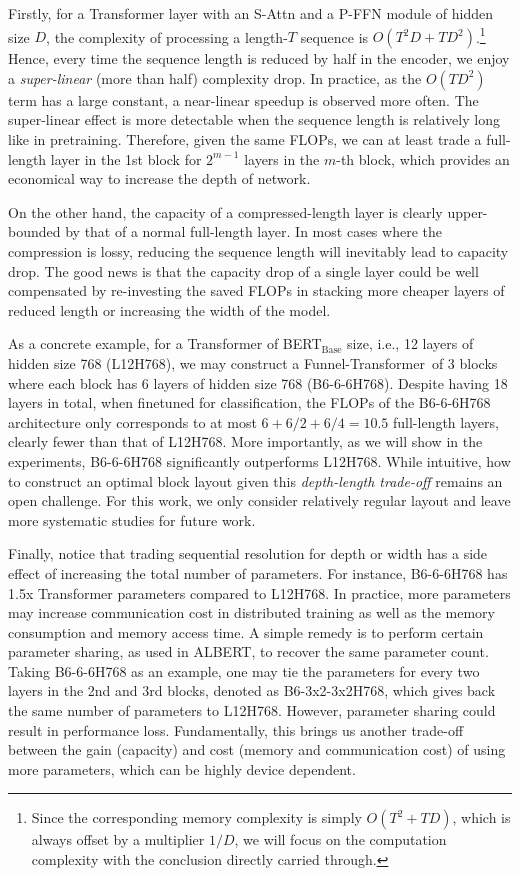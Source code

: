 \documentclass{article}
\theoremstyle{custom}
\newcommand{\name}{Funnel-Transformer~}
\begin{document}
Firstly, for a Transformer layer with an S-Attn and a P-FFN module of hidden size $D$, the complexity of processing a length-$T$ sequence is $O(T^2D + TD^2)$.\footnote{Since the corresponding memory complexity is simply $O(T^2 + TD)$, which is always offset by a multiplier $1/D$, we will focus on the computation complexity with the conclusion directly carried through.}
Hence, every time the sequence length is reduced by half in the encoder, we enjoy a \textit{super-linear} (more than half) complexity drop.
In practice, as the $O(TD^2)$ term has a large constant, a near-linear speedup is observed more often. 
The super-linear effect is more detectable when the sequence length is relatively long like in pretraining.
Therefore, given the same FLOPs, we can at least trade a full-length layer in the 1st block for $2^{m-1}$ layers in the $m$-th block, which provides an economical way to increase the depth of network.

On the other hand, the capacity of a compressed-length layer is clearly upper-bounded by that of a normal full-length layer.
In most cases where the compression is lossy, reducing the sequence length will inevitably lead to capacity drop.
The good news is that the capacity drop of a single layer could be well compensated by re-investing the saved FLOPs in stacking more cheaper layers of reduced length or increasing the width of the model.

As a concrete example, for a Transformer of BERT$_\text{Base}$ size, i.e., 12 layers of hidden size 768 (L12H768), we may construct a \name of 3 blocks where each block has 6 layers of hidden size 768 (B6-6-6H768).
Despite having 18 layers in total, when finetuned for classification, the FLOPs of the B6-6-6H768 architecture only corresponds to at most $6 + 6 / 2 + 6 / 4 = 10.5$ full-length layers, clearly fewer than that of L12H768.
More importantly, as we will show in the experiments, B6-6-6H768 significantly outperforms L12H768.
While intuitive, how to construct an optimal block layout given this \textit{depth-length trade-off} remains an open challenge.
For this work, we only consider relatively regular layout and leave more systematic studies for future work.

Finally, notice that trading sequential resolution for depth or width has a side effect of increasing the total number of parameters.
For instance, B6-6-6H768 has 1.5x Transformer parameters compared to L12H768.
In practice, more parameters may increase communication cost in distributed training as well as the memory consumption and memory access time.
A simple remedy is to perform certain parameter sharing, as used in ALBERT, to recover the same parameter count.
Taking B6-6-6H768 as an example, one may tie the parameters for every two layers in the 2nd and 3rd blocks, denoted as B6-3x2-3x2H768, which gives back the same number of parameters to L12H768.
However, parameter sharing could result in performance loss.
Fundamentally, this brings us another trade-off between the gain (capacity) and cost (memory and communication cost) of using more parameters, which can be highly device dependent.
\end{document}
